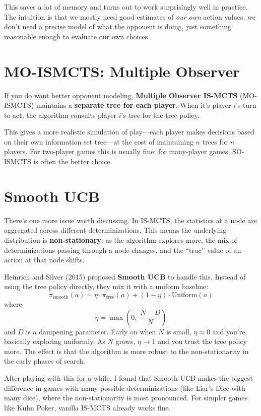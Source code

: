 \documentclass[11pt]{article}
\begin{document}
This saves a lot of memory and turns out to work surprisingly well in practice. The intuition is that we mostly need good estimates of \emph{our own} action values; we don't need a precise model of what the opponent is doing, just something reasonable enough to evaluate our own choices.

\section{MO-ISMCTS: Multiple Observer}

If you do want better opponent modeling, \textbf{Multiple Observer IS-MCTS} (MO-ISMCTS) maintains a \textbf{separate tree for each player}. When it's player $i$'s turn to act, the algorithm consults player $i$'s tree for the tree policy.

This gives a more realistic simulation of play---each player makes decisions based on their own information set tree---at the cost of maintaining $n$ trees for $n$ players. For two-player games this is usually fine; for many-player games, SO-ISMCTS is often the better choice.

\section{Smooth UCB}

There's one more issue worth discussing. In IS-MCTS, the statistics at a node are aggregated across different determinizations. This means the underlying distribution is \textbf{non-stationary}: as the algorithm explores more, the mix of determinizations passing through a node changes, and the ``true'' value of an action at that node shifts.

Heinrich and Silver (2015) proposed \textbf{Smooth UCB} to handle this. Instead of using the tree policy directly, they mix it with a uniform baseline:
\[
\pi_{\text{smooth}}(a) = \eta \cdot \pi_{\text{tree}}(a) + (1 - \eta) \cdot \text{Uniform}(a)
\]
where
\[
\eta = \max\!\left(0,\; \frac{N - D}{N}\right)
\]
and $D$ is a dampening parameter. Early on when $N$ is small, $\eta \approx 0$ and you're basically exploring uniformly. As $N$ grows, $\eta \to 1$ and you trust the tree policy more. The effect is that the algorithm is more robust to the non-stationarity in the early phases of search.

After playing with this for a while, I found that Smooth UCB makes the biggest difference in games with many possible determinizations (like Liar's Dice with many dice), where the non-stationarity is most pronounced. For simpler games like Kuhn Poker, vanilla IS-MCTS already works fine.
\end{document}
